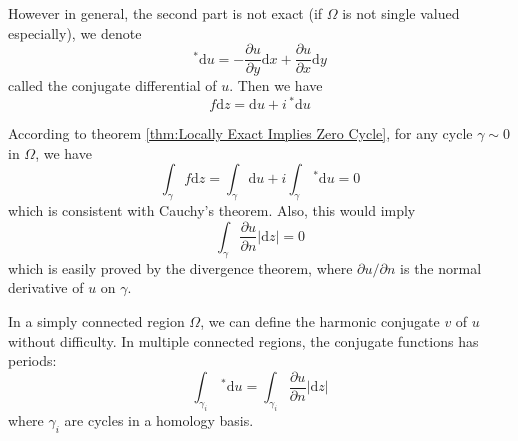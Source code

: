 \documentclass[../main.tex]{subfiles}
\begin{document}
However in general, the second part is not exact (if $\Omega$ is not single valued especially), we denote
\begin{equation*}
	^* \mathrm{d} u = -\frac{\partial u}{\partial y} \mathrm{d} x + \frac{\partial u}{\partial x} \mathrm{d} y
\end{equation*}
called the conjugate differential of $u$. Then we have
\begin{equation}
	f \mathrm{d} z = \mathrm{d} u + i \, ^* \mathrm{d} u
\end{equation}

According to theorem \ref{thm:Locally Exact Implies Zero Cycle}, for any cycle $\gamma\sim 0$ in $\Omega$, we have
\begin{equation*}
	\int_{\gamma} f \mathrm{d} z = \int_{\gamma} \mathrm{d} u + i \int_{\gamma} \, ^* \mathrm{d} u = 0
\end{equation*}
which is consistent with Cauchy's theorem. Also, this would imply
\begin{equation}
	\int_{\gamma} \frac{\partial u}{\partial n} \left|\mathrm{d} z\right| = 0
\end{equation}
which is easily proved by the divergence theorem, where $\partial u / \partial n$ is the normal derivative of $u$ on $\gamma$.

In a simply connected region $\Omega$, we can define the harmonic conjugate $v$ of $u$ without difficulty. In multiple connected regions, the conjugate functions has periods:
\begin{equation*}
	\int_{\gamma_i} \, ^* \mathrm{d} u = \int_{\gamma_i} \frac{\partial u}{\partial n} \left|\mathrm{d} z\right|
\end{equation*}
where $\gamma_i$ are cycles in a homology basis.
\end{document}
